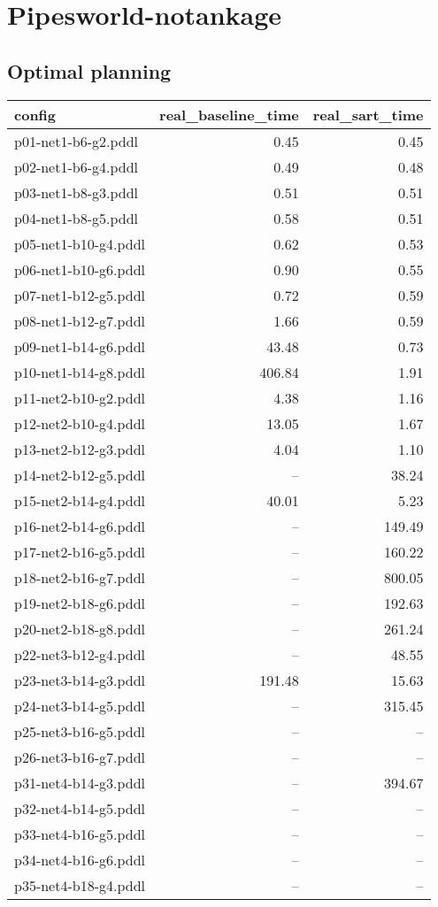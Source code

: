 \documentclass{article}
\begin{document}
                \newpage \section{Pipesworld-notankage}
                    \subsection*{Optimal planning}
                    
                            \begin{center}
                            \scriptsize
                            \begin{tabular}{@{}l|r|r@{}}
                            config & real\_baseline\_time & real\_sart\_time\\\midrule
                             p01-net1-b6-g2.pddl&0.45&0.45\\
 p02-net1-b6-g4.pddl&0.49&0.48\\
 p03-net1-b8-g3.pddl&0.51&0.51\\
 p04-net1-b8-g5.pddl&0.58&0.51\\
 p05-net1-b10-g4.pddl&0.62&0.53\\
 p06-net1-b10-g6.pddl&0.90&0.55\\
 p07-net1-b12-g5.pddl&0.72&0.59\\
 p08-net1-b12-g7.pddl&1.66&0.59\\
 p09-net1-b14-g6.pddl&43.48&0.73\\
 p10-net1-b14-g8.pddl&406.84&1.91\\
 p11-net2-b10-g2.pddl&4.38&1.16\\
 p12-net2-b10-g4.pddl&13.05&1.67\\
 p13-net2-b12-g3.pddl&4.04&1.10\\
 p14-net2-b12-g5.pddl&--&38.24\\
 p15-net2-b14-g4.pddl&40.01&5.23\\
 p16-net2-b14-g6.pddl&--&149.49\\
 p17-net2-b16-g5.pddl&--&160.22\\
 p18-net2-b16-g7.pddl&--&800.05\\
 p19-net2-b18-g6.pddl&--&192.63\\
 p20-net2-b18-g8.pddl&--&261.24\\
 p22-net3-b12-g4.pddl&--&48.55\\
 p23-net3-b14-g3.pddl&191.48&15.63\\
 p24-net3-b14-g5.pddl&--&315.45\\
 p25-net3-b16-g5.pddl&--&--\\
 p26-net3-b16-g7.pddl&--&--\\
 p31-net4-b14-g3.pddl&--&394.67\\
 p32-net4-b14-g5.pddl&--&--\\
 p33-net4-b16-g5.pddl&--&--\\
 p34-net4-b16-g6.pddl&--&--\\
 p35-net4-b18-g4.pddl&--&--
                            \end{tabular}
                            \end{center}
                    
\end{document}
